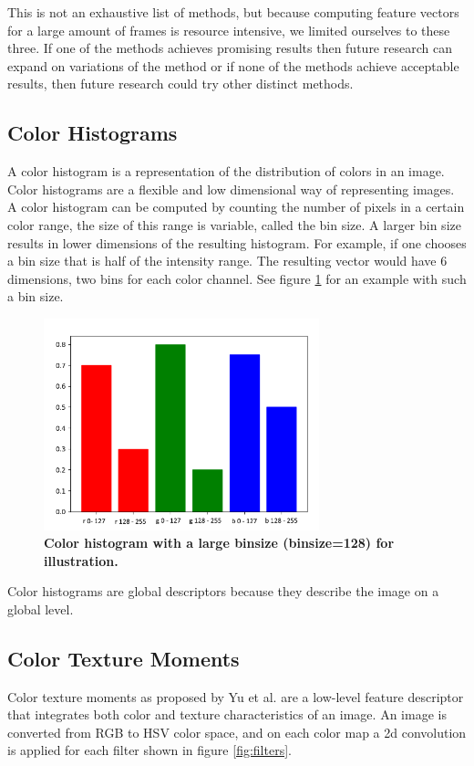 \documentclass{article}
\begin{document}
This is not an exhaustive list of methods, but because computing feature vectors for a large amount of frames is resource intensive, we limited ourselves to these three. If one of the methods achieves promising results then future research can expand on variations of the method or if none of the methods achieve acceptable results, then future research could try other distinct methods.

\subsection{Color Histograms}
A color histogram is a representation of the distribution of colors in an image. Color histograms are a flexible and low dimensional way of representing images. A color histogram can be computed by counting the number of pixels in a certain color range, the size of this range is variable, called the bin size. A larger bin size results in lower dimensions of the resulting histogram. For example, if one chooses a bin size that is half of the intensity range. The resulting vector would have 6 dimensions, two bins for each color channel. See figure \ref{fig:colorhistogram} for an example with such a bin size.
\begin{figure}[H]
	\includegraphics[width=8cm]{images/colorhistogram.png}
	\centering
	\caption{\textbf{Color histogram with a large binsize (binsize=128) for illustration.}}
	\label{fig:colorhistogram}
\end{figure}
Color histograms are global descriptors because they describe the image on a global level.

\subsection{Color Texture Moments}
Color texture moments as proposed by Yu et al. \cite{yu2002colortexturemoments} are a low-level feature descriptor that integrates both color and texture characteristics of an image. An image is converted from RGB to HSV color space, and on each color map a 2d convolution is applied for each filter shown in figure \ref{fig:filters}.
\end{document}
